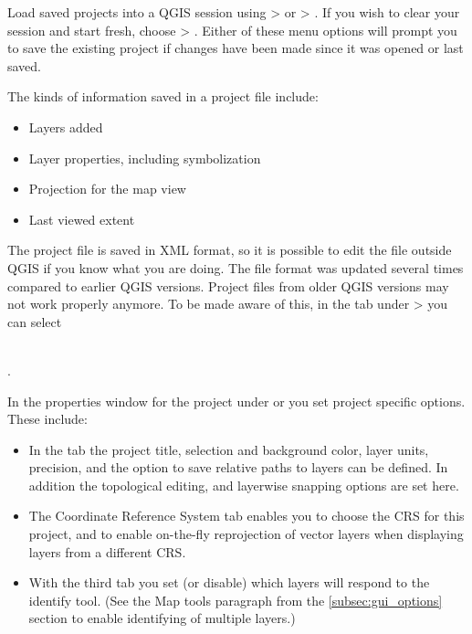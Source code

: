 Load saved projects into a QGIS session using 
 > 
or  > .
If you wish to clear your session and start fresh, choose
 > .
Either of these menu options will prompt you to save the existing project
if changes have been made since it was opened or last saved.

The kinds of information saved in a project file include:

\begin{itemize}
\item Layers added
\item Layer properties, including symbolization
\item Projection for the map view
\item Last viewed extent
\end{itemize}

The project file is saved in XML format, so it is possible to edit
the file outside QGIS if you know what you are doing. The file format 
was updated several times compared to earlier QGIS versions. Project files 
from older QGIS versions may not work properly anymore. To be made aware of this, 
in the  tab under  >  
you can select 

 \\
.

In the properties window for the project under  or  you set project specific options. These
include:

\begin{itemize}
\item In the  tab the project title, selection and background
color, layer units, precision, and the option to save relative paths to
layers can be defined. In addition the topological editing, and layerwise 
snapping options are set here.
\item The  Coordinate Reference System tab enables you to choose the
CRS for this project, and to enable on-the-fly reprojection of vector layers
when displaying layers from a different CRS.
\item With the third  tab you set (or disable) which
layers will respond to the identify tool. (See the Map tools paragraph from
the \ref{subsec:gui_options} section to enable identifying of multiple layers.)
\end{itemize}
 

